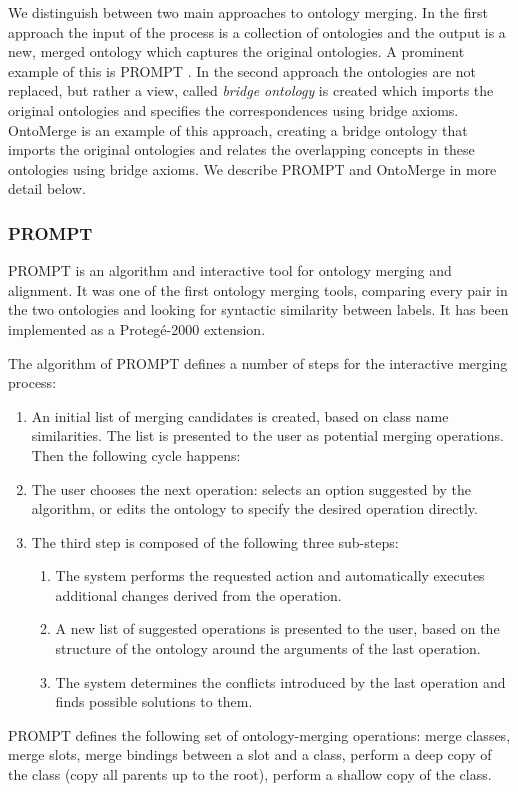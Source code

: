 We distinguish between two main approaches to ontology merging. In the
first approach the input of the process is a collection of ontologies
and the output is a new, merged ontology which captures the original
ontologies. A prominent example of this is PROMPT \cite{noy2000prompt}. 
In the second approach the ontologies are not replaced, but
rather a {\textquotesingle}view{\textquotesingle}, called
\textit{bridge ontology} is created which imports the original
ontologies and specifies the correspondences using bridge axioms.
OntoMerge \cite{dou2002ontology_translation} is an example of this approach, creating a
bridge ontology that imports the original ontologies and relates the
overlapping concepts in these ontologies using bridge axioms. We
describe PROMPT and OntoMerge in more detail below. 

\subsubsection{PROMPT}
\label{subsubsec:mediationapproaches_ontologymerging_PROMPT}
PROMPT \cite{noy2000prompt} is an algorithm and interactive tool for
ontology merging and alignment. It was one of the first ontology
merging tools, comparing every pair in the two ontologies and looking
for syntactic similarity between labels. It has been implemented as a
Proteg\'e-2000 extension. 

The algorithm of PROMPT defines a number of steps for the interactive
merging process: 

\begin{enumerate}
\item An initial list of merging candidates is created, based on class
name similarities. The list is presented to the user as potential
merging operations. Then the following cycle happens: 
\item The user chooses the next operation: selects an option suggested
by the algorithm, or edits the ontology to specify the desired
operation directly. 
\item The third step is composed of the following three sub-steps: 

\begin{enumerate}
\item The system performs the requested action and automatically
executes additional changes derived from the operation. 
\item A new list of suggested operations is presented to the user, based
on the structure of the ontology around the arguments of the last
operation. 
\item The system determines the conflicts introduced by the last
operation and finds possible solutions to them. 
\end{enumerate}
\end{enumerate}
PROMPT defines the following set of ontology-merging operations: merge
classes, merge slots, merge bindings between a slot and a class,
perform a deep copy of the class (copy all parents up to the root),
perform a shallow copy of the class. 

